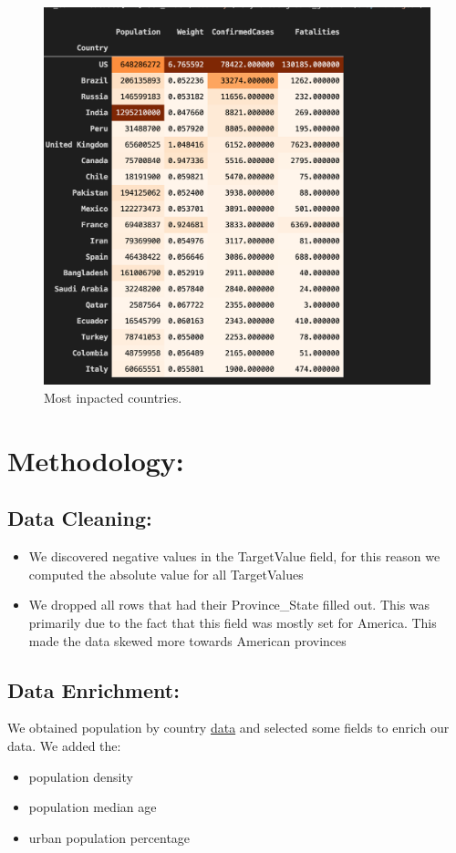 \documentclass{article}
\begin{document}
\begin{figure}
  \centering
  \includegraphics[width=\columnwidth]{covid_top_n_countries.png}
  \caption{Most inpacted countries.}
\end{figure}
\section{Methodology:}
\subsection{Data Cleaning:}
\begin{itemize}
\item We discovered negative values in the TargetValue field, for this reason we computed the absolute value for all TargetValues
\item We dropped all rows that had their Province\_State filled out. This was primarily due to the fact that this field was mostly set for America. This made the data skewed more towards American provinces
\end{itemize}
\subsection{Data Enrichment:}
We obtained population by country \href{https://github.com/acquayefrank/MLDM2020-Project/blob/master/data/population_by_country_2020.csv}{data} and selected some fields to enrich our data.
We added the:
\begin{itemize}
  \item  population density
  \item  population median age
  \item  urban population  percentage
\end{itemize}
\end{document}
